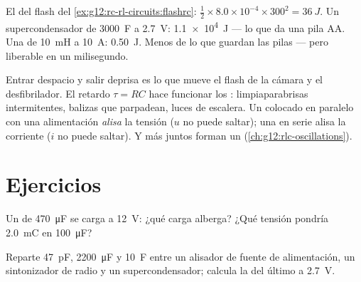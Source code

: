 \begin{example}\label{ex:g12:rc-rl-circuits:energies}
El  del flash del \cref{ex:g12:rc-rl-circuits:flashrc}:
$\tfrac12 \times 8.0\times10^{-4} \times 300^2 = \qty{36}{J}$. Un supercondensador de
\qty{3000}{F} a \qty{2.7}{V}: \qty{1.1e4}{J} --- lo que da una pila AA. Una  de
\qty{10}{mH} a \qty{10}{A}: \qty{0.50}{J}. Menos de lo que guardan las pilas --- pero
liberable en un milisegundo.
\end{example}

\begin{remark}\label{rem:g12:rc-rl-circuits:applications}
Entrar despacio y salir deprisa es lo que mueve el flash de la cámara y el
desfibrilador. El retardo $\tau = RC$ hace funcionar los :
limpiaparabrisas intermitentes, balizas que parpadean, luces de escalera. Un
 colocado en paralelo con una alimentación \emph{alisa} la tensión ($u$ no
puede saltar); una  en serie alisa la corriente ($i$ no puede saltar). Y 
más  juntos forman un  (\cref{ch:g12:rlc-oscillations}).
\end{remark}

\section{Ejercicios}

\begin{exercise}[$\star$]\label{exo:g12:rc-rl-circuits:1}
Un  de \qty{470}{\micro F} se carga a \qty{12}{V}: ¿qué carga alberga? ¿Qué
tensión pondría \qty{2.0}{mC} en \qty{100}{\micro F}?
\end{exercise}

\begin{exercise}[$\star$]\label{exo:g12:rc-rl-circuits:2}
Reparte \qty{47}{pF}, \qty{2200}{\micro F} y \qty{10}{F} entre un alisador de fuente
de alimentación, un sintonizador de radio y un supercondensador; calcula la 
del último a \qty{2.7}{V}.
\end{exercise}

